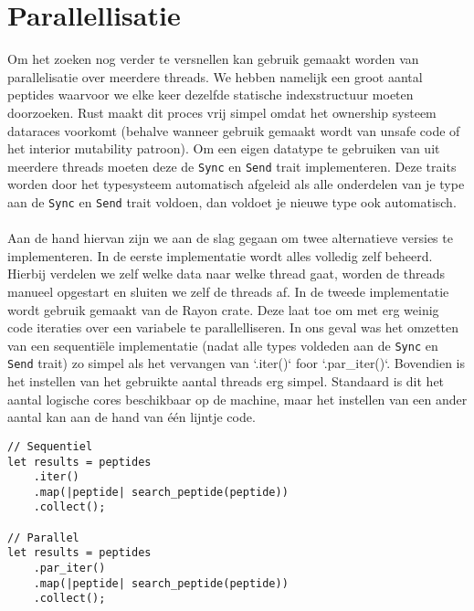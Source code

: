 \section{Parallellisatie}\label{sec:parallellisatie}
Om het zoeken nog verder te versnellen kan gebruik gemaakt worden van parallelisatie over meerdere threads.
We hebben namelijk een groot aantal peptides waarvoor we elke keer dezelfde statische indexstructuur moeten doorzoeken.
Rust maakt dit proces vrij simpel omdat het ownership systeem dataraces voorkomt (behalve wanneer gebruik gemaakt wordt van unsafe code of het interior mutability patroon)\cite{rust_data_races}.
Om een eigen datatype te gebruiken van uit meerdere threads moeten deze de \texttt{Sync} en \texttt{Send} trait implementeren.
Deze traits worden door het typesysteem automatisch afgeleid als alle onderdelen van je type aan de \texttt{Sync} en \texttt{Send} trait voldoen, dan voldoet je nieuwe type ook automatisch. %
\\ \\
Aan de hand hiervan zijn we aan de slag gegaan om twee alternatieve versies te implementeren.
In de eerste implementatie wordt alles volledig zelf beheerd.
Hierbij verdelen we zelf welke data naar welke thread gaat, worden de threads manueel opgestart en sluiten we zelf de threads af.
In de tweede implementatie wordt gebruik gemaakt van de Rayon crate\cite{rayon}.
Deze laat toe om met erg weinig code iteraties over een variabele te parallelliseren.
In ons geval was het omzetten van een sequentiële implementatie (nadat alle types voldeden aan de \texttt{Sync} en \texttt{Send} trait) zo simpel als het vervangen van `.iter()` foor `.par\_iter()`.
Bovendien is het instellen van het gebruikte aantal threads erg simpel.
Standaard is dit het aantal logische cores beschikbaar op de machine, maar het instellen van een ander aantal kan aan de hand van één lijntje code.

\begin{verbatim}
// Sequentiel
let results = peptides
    .iter()
    .map(|peptide| search_peptide(peptide))
    .collect();

// Parallel
let results = peptides
    .par_iter()
    .map(|peptide| search_peptide(peptide))
    .collect();
\end{verbatim}

